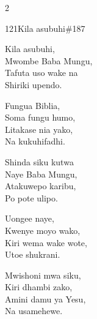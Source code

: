 \begin{multicols}{2}
\begin{hymn}{121}{Kila asubuhi}{\#187}
\begin{stanza}
Kila asubuhi,\\
Mwombe Baba Mungu,\\
Tafuta uso wake na\\
Shiriki upendo.
\end{stanza}
\begin{stanza}
Fungua Biblia,\\
Soma fungu humo,\\
Litakase nia yako,\\
Na kukuhifadhi.
\end{stanza}
\begin{stanza}
Shinda siku kutwa\\
Naye Baba Mungu,\\
Atakuwepo karibu,\\
Po pote ulipo.
\end{stanza}
\begin{stanza}
Uongee naye,\\
Kwenye moyo wako,\\
Kiri wema wake wote,\\
Utoe shukrani.
\end{stanza}
\begin{stanza}
Mwishoni mwa siku,\\
Kiri dhambi zako,\\
Amini damu ya Yesu,\\
Na usamehewe.
\end{stanza}
\end{hymn}


\end{multicols}
